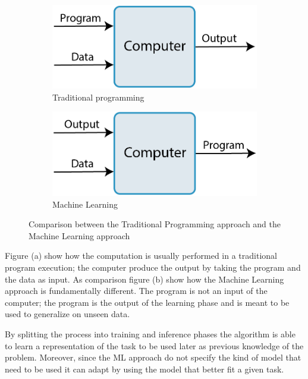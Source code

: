 \documentclass[../main.tex]{subfiles}
\begin{document}
\begin{figure}[h!]
    \centering
    \begin{subfigure}[]{0.4\textwidth}
        \includegraphics[width=\textwidth]{images/ML1.png}
        \caption{Traditional programming}
    \end{subfigure}
    \hspace{.1\linewidth}
    \begin{subfigure}[]{0.4\textwidth}
        \includegraphics[width=\textwidth]{images/ML2.png}
        \caption{Machine Learning}
        \label{fig:ML2}
    \end{subfigure}
    \caption{ Comparison between the Traditional Programming approach and the Machine Learning approach}
    \label{fig:ML}
\end{figure}

Figure (a) show how the computation is usually performed in a traditional program execution; the computer produce the output by taking the program and the data as input. As comparison figure (b) show how the Machine Learning approach is fundamentally different. The program is not an input of the computer; the program is the output of the learning phase and is meant to be used to generalize on unseen data.

By splitting the process into training and inference phases the algorithm is able to learn a representation of the task to be used later as previous knowledge of the problem. 
Moreover, since the ML approach do not specify the kind of model that need to be used it can adapt by using the model that better fit a given task.
\end{document}
